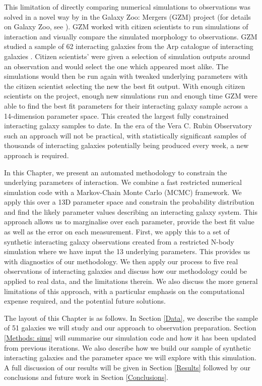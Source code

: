 This limitation of directly comparing numerical simulations to observations was solved in a novel way by \citet{2016MNRAS.459..720H} in the Galaxy Zoo: Mergers (GZM) project (for details on Galaxy Zoo, see \citet{2008MNRAS.389.1179L}). GZM worked with citizen scientists to run simulations of interaction and visually compare the simulated morphology to observations. GZM studied a sample of 62 interacting galaxies from the Arp catalogue of interacting galaxies \citep{1966ApJS...14....1A}. Citizen scientists' were given a selection of simulation outputs around an observation and would select the one which appeared most alike. The simulations would then be run again with tweaked underlying parameters with the citizen scientist selecting the new the best fit output. With enough citizen scientists on the project, enough new simulations run and enough time GZM were able to find the best fit parameters for their interacting galaxy sample across a 14-dimension parameter space. This created the largest fully constrained interacting galaxy samples to date. In the era of the Vera C. Rubin Observatory such an approach will not be practical, with statistically significant samples of thousands of interacting galaxies potentially being produced every week, a new approach is required.

In this Chapter, we present an automated methodology to constrain the underlying parameters of interaction. We combine a fast restricted numerical simulation code with a Markov-Chain Monte Carlo (MCMC) framework. We apply this over a 13D parameter space and constrain the probability distribution and find the likely parameter values describing an interacting galaxy system. This approach allows us to marginalise over each parameter, provide the best fit value as well as the error on each measurement. First, we apply this to a set of synthetic interacting galaxy observations created from a restricted N-body simulation where we have input the 13 underlying parameters. This provides us with diagnostics of our methodology. We then apply our process to five real observations of interacting galaxies and discuss how our methodology could be applied to real data, and the limitations therein. We also discuss the more general limitations of this approach, with a particular emphasis on the computational expense required, and the potential future solutions.

The layout of this Chapter is as follows. In Section \ref{Data}, we describe the sample of 51 galaxies we will study and our approach to observation preparation. Section \ref{Methods: sims} will summarise our simulation code and how it has been updated from previous iterations. We also describe how we build our sample of synthetic interacting galaxies and the parameter space we will explore with this simulation. A full discussion of our results will be given in Section \ref{Results} followed by our conclusions and future work in Section \ref{Conclusions}.

